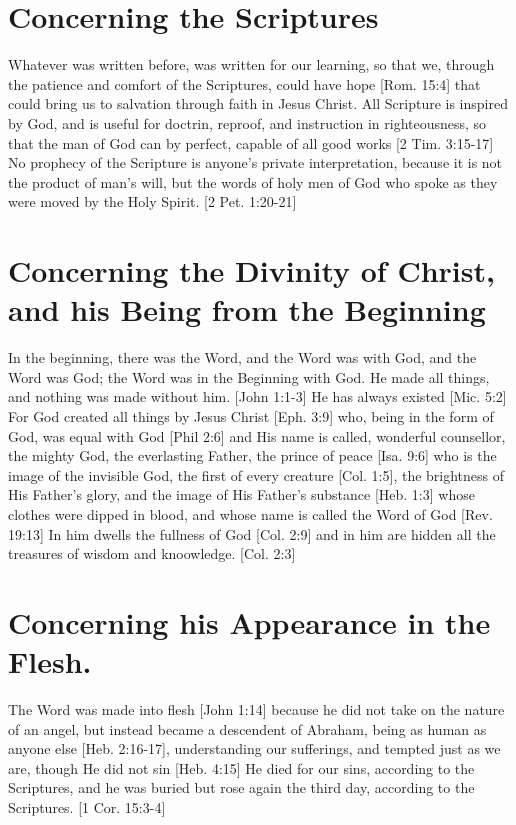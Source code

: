 \documentclass[../main.tex]{subfiles}
\begin{document}
	\section{Concerning the Scriptures}

	Whatever was written before, was written for our learning, so that we, through the patience and comfort of the Scriptures, could have hope [Rom. 15:4] that could bring us to salvation through faith in Jesus Christ. All Scripture is inspired by God, and is useful for doctrin, reproof, and instruction in righteousness, so that the man of God can by perfect, capable of all good works [2 Tim. 3:15-17] No prophecy of the Scripture is anyone's private interpretation, because it is not the product of man's will, but the words of holy men of God who spoke as they were moved by the Holy Spirit. [2 Pet. 1:20-21]

	\section{Concerning the Divinity of Christ, and his Being from the Beginning}

	In the beginning, there was the Word, and the Word was with God, and the Word was God; the Word was in the Beginning with God. He made all things, and nothing was made without him. [John 1:1-3] He has always existed [Mic. 5:2] For God created all things by Jesus Christ [Eph. 3:9] who, being in the form of God, was equal with God [Phil 2:6] and His name is called, wonderful counsellor, the mighty God, the everlasting Father, the prince of peace [Isa. 9:6] who is the image of the invisible God, the first of every creature [Col. 1:5], the brightness of His Father's glory, and the image of His Father's substance [Heb. 1:3] whose clothes were dipped in blood, and whose name is called the Word of God [Rev. 19:13] In him dwells the fullness of God [Col. 2:9] and in him are hidden all the treasures of wisdom and knoowledge. [Col. 2:3]

	\section{Concerning his Appearance in the Flesh.}

	The Word was made into flesh [John 1:14] because he did not take on the nature of an angel, but instead became a descendent of Abraham, being as human as anyone else [Heb. 2:16-17], understanding our sufferings, and tempted just as we are, though He did not sin [Heb. 4:15] He died for our sins, according to the Scriptures, and he was buried but rose again the third day, according to the Scriptures. [1 Cor. 15:3-4]
\end{document}
